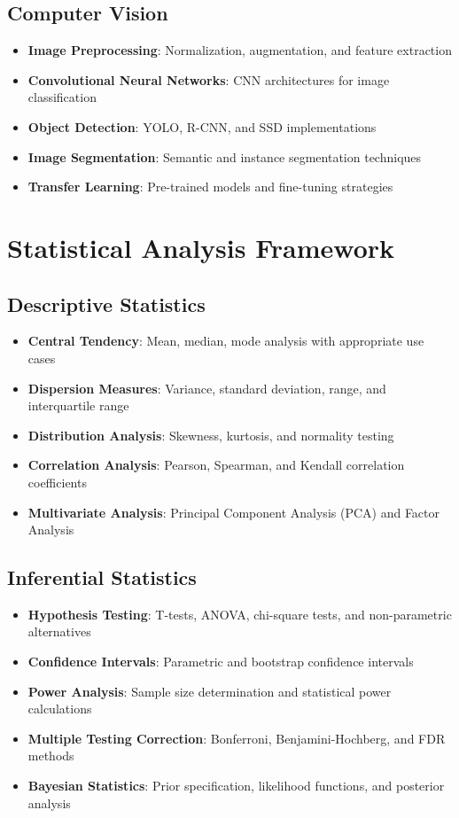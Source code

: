 \documentclass[11pt,a4paper]{article}
\begin{document}
\subsection{Computer Vision}
\begin{itemize}[leftmargin=*]
    \item \textbf{Image Preprocessing}: Normalization, augmentation, and feature extraction
    \item \textbf{Convolutional Neural Networks}: CNN architectures for image classification
    \item \textbf{Object Detection}: YOLO, R-CNN, and SSD implementations
    \item \textbf{Image Segmentation}: Semantic and instance segmentation techniques
    \item \textbf{Transfer Learning}: Pre-trained models and fine-tuning strategies
\end{itemize}

\section{Statistical Analysis Framework}

\subsection{Descriptive Statistics}
\begin{itemize}[leftmargin=*]
    \item \textbf{Central Tendency}: Mean, median, mode analysis with appropriate use cases
    \item \textbf{Dispersion Measures}: Variance, standard deviation, range, and interquartile range
    \item \textbf{Distribution Analysis}: Skewness, kurtosis, and normality testing
    \item \textbf{Correlation Analysis}: Pearson, Spearman, and Kendall correlation coefficients
    \item \textbf{Multivariate Analysis}: Principal Component Analysis (PCA) and Factor Analysis
\end{itemize}

\subsection{Inferential Statistics}
\begin{itemize}[leftmargin=*]
    \item \textbf{Hypothesis Testing}: T-tests, ANOVA, chi-square tests, and non-parametric alternatives
    \item \textbf{Confidence Intervals}: Parametric and bootstrap confidence intervals
    \item \textbf{Power Analysis}: Sample size determination and statistical power calculations
    \item \textbf{Multiple Testing Correction}: Bonferroni, Benjamini-Hochberg, and FDR methods
    \item \textbf{Bayesian Statistics}: Prior specification, likelihood functions, and posterior analysis
\end{itemize}
\end{document}
